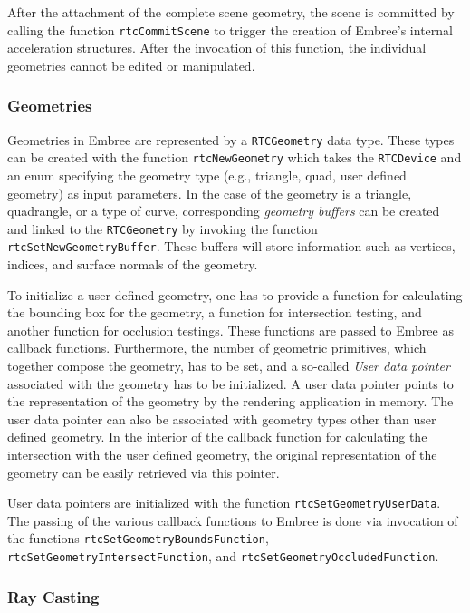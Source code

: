 After the attachment of the complete scene geometry, the scene is committed by calling the function \texttt{rtcCommitScene} to trigger the creation of Embree's internal acceleration structures. After the invocation of this function, the individual geometries cannot be edited or manipulated.

\subsubsection{Geometries}

Geometries in Embree are represented by a \texttt{RTCGeometry} data type. These types can be created with the function \texttt{rtcNewGeometry} which takes the \texttt{RTCDevice} and an enum specifying the geometry type (e.g., triangle, quad, user defined geometry) as input parameters. In the case of the geometry is a triangle, quadrangle, or a type of curve, corresponding \emph{geometry buffers} can be created and linked to the \texttt{RTCGeometry} by invoking the function \texttt{rtcSetNewGeometryBuffer}. These buffers will store information such as vertices, indices, and surface normals of the geometry.  

To initialize a user defined geometry, one has to provide a function for calculating the bounding box for the geometry, a function for intersection testing, and another function for occlusion testings. These functions are passed to Embree as callback functions. Furthermore, the number of geometric primitives, which together compose the geometry, has to be set, and a so-called \emph{User data pointer} associated with the geometry has to be initialized. A user data pointer points to the representation of the geometry by the rendering application in memory. The user data pointer can also be associated with geometry types other than user defined geometry.
In the interior of the callback function for calculating the intersection with the user defined geometry, the original representation of the geometry can be easily retrieved via this pointer.

User data pointers are initialized with the function \texttt{rtcSetGeometryUserData}.
The passing of the various callback functions to Embree is done via invocation of the functions \texttt{rtcSetGeometryBoundsFunction}, \texttt{rtcSetGeometryIntersectFunction}, and \texttt{rtcSetGeometryOccludedFunction}.

\subsubsection{Ray Casting}

